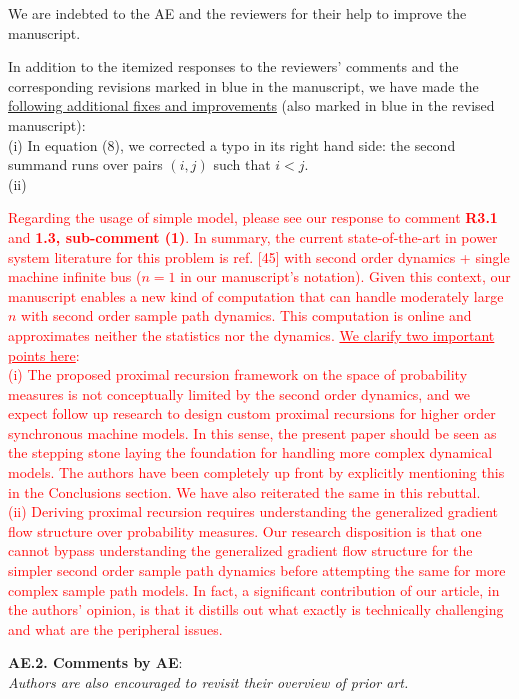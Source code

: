 \documentclass[12pt,onecolumn]{IEEEtran}
\newcommand{\blue}{\color{blue}}
\newcommand{\red}{\textcolor{red}}
\newcommand{\nib}{\noindent  {\bf Response:} }
\begin{document}
{\nib {\blue We are indebted to the AE and the reviewers for their help to improve the manuscript.

In addition to the itemized responses to the reviewers' comments and the corresponding revisions marked in blue in the manuscript, we have made the \ul{following additional fixes and improvements} (also marked in blue in the revised manuscript):\\
(i) In equation (8), we corrected a typo in its right hand side: the second summand runs over pairs $(i,j)$ such that $i<j$.\\
(ii) 

{\red{Regarding the usage of simple model, please see our response to comment \textbf{R3.1} and \textbf{1.3, sub-comment (1)}. In summary, the current state-of-the-art in power system literature for this problem is ref. [45] with second order dynamics + single machine infinite bus ($n=1$ in our manuscript's notation). Given this context, our manuscript enables a new kind of computation that can handle moderately large $n$ with second order sample path dynamics. This computation is online and approximates neither the statistics nor the dynamics.  \ul{We clarify two important points here}:\\(i) The proposed proximal recursion framework on the space of probability measures is not conceptually limited by the second order dynamics, and we expect follow up research to design custom proximal recursions for higher order synchronous machine models. In this sense, the present paper should be seen as the stepping stone laying the foundation for handling more complex dynamical models. The authors have been completely up front by explicitly mentioning this in the Conclusions section. We have also reiterated the same in this rebuttal.\\(ii) Deriving proximal recursion requires understanding the generalized gradient flow structure over probability measures. Our research disposition is that one cannot bypass understanding the generalized gradient flow structure for the simpler second order sample path dynamics before attempting the same for more complex sample path models. In fact, a significant contribution of our article, in the authors' opinion, is that it distills out what exactly is technically challenging and what are the peripheral issues.}} 
}}


\noindent
{\bf AE.2. Comments by AE}:\\
{\em Authors are also encouraged to revisit their overview of prior art.}
\end{document}
